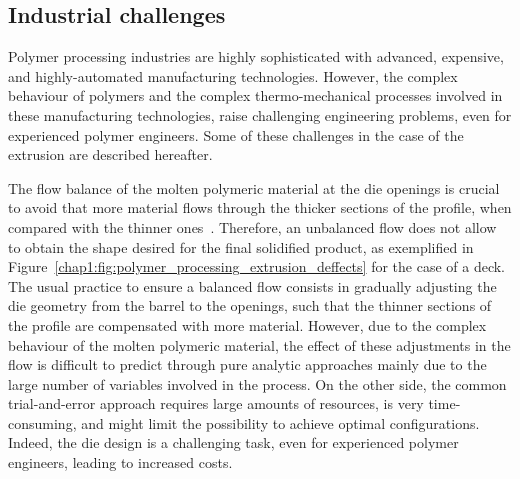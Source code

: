 \subsection{Industrial challenges}
\label{chap1:subsec:polymer_processing_industrial_challenges}

Polymer processing industries are highly sophisticated with advanced, expensive, and highly-automated manufacturing technologies.
However, the complex behaviour of polymers and the complex thermo-mechanical processes involved in these manufacturing technologies, raise challenging engineering problems, even for experienced polymer engineers.
Some of these challenges in the case of the extrusion are described hereafter.

The flow balance of the molten polymeric material at the die openings is crucial to avoid that more material flows through the thicker sections of the profile, when compared with the thinner ones~\cite{chap1:2017rajkumar}.
Therefore, an unbalanced flow does not allow to obtain the shape desired for the final solidified product, as exemplified in Figure~\ref{chap1:fig:polymer_processing_extrusion_deffects} for the case of a deck.
The usual practice to ensure a balanced flow consists in gradually adjusting the die geometry from the barrel to the openings, such that the thinner sections of the profile are compensated with more material.
However, due to the complex behaviour of the molten polymeric material, the effect of these adjustments in the flow is difficult to predict through pure analytic approaches mainly due to the large number of variables involved in the process.
On the other side, the common trial-and-error approach requires large amounts of resources, is very time-consuming, and might limit the possibility to achieve optimal configurations.
Indeed, the die design is a challenging task, even for experienced polymer engineers, leading to increased costs.

